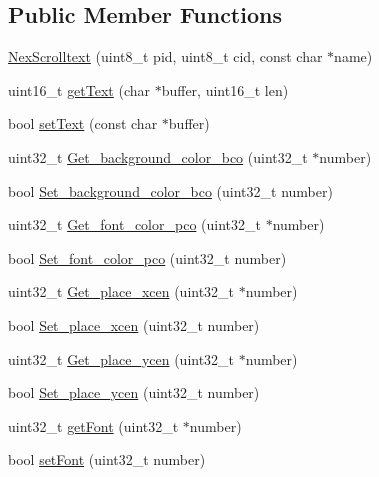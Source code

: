 \subsection*{Public Member Functions}
\begin{DoxyCompactItemize}
\item 
\hyperlink{class_nex_scrolltext_a212aa1505ed7c0bfdb47de3e6e2045fb}{Nex\+Scrolltext} (uint8\+\_\+t pid, uint8\+\_\+t cid, const char $\ast$name)
\item 
uint16\+\_\+t \hyperlink{class_nex_scrolltext_a7cead053146075e7c31d43349d4c897c}{get\+Text} (char $\ast$buffer, uint16\+\_\+t len)
\item 
bool \hyperlink{class_nex_scrolltext_a71b8e2b2bff22e3c0cbdf961a55b8d12}{set\+Text} (const char $\ast$buffer)
\item 
uint32\+\_\+t \hyperlink{class_nex_scrolltext_ac3861fec5efd8cde4535307f231244e7}{Get\+\_\+background\+\_\+color\+\_\+bco} (uint32\+\_\+t $\ast$number)
\item 
bool \hyperlink{class_nex_scrolltext_a50a5211fc6913b97afda045a762cb0c4}{Set\+\_\+background\+\_\+color\+\_\+bco} (uint32\+\_\+t number)
\item 
uint32\+\_\+t \hyperlink{class_nex_scrolltext_a266a3c44131eec0a40b1e12f6cf7d3a1}{Get\+\_\+font\+\_\+color\+\_\+pco} (uint32\+\_\+t $\ast$number)
\item 
bool \hyperlink{class_nex_scrolltext_ac34d68211c4c3c70834c7e7e49ece03f}{Set\+\_\+font\+\_\+color\+\_\+pco} (uint32\+\_\+t number)
\item 
uint32\+\_\+t \hyperlink{class_nex_scrolltext_a066d8439ea088a7ef604abb87802add6}{Get\+\_\+place\+\_\+xcen} (uint32\+\_\+t $\ast$number)
\item 
bool \hyperlink{class_nex_scrolltext_a5126fc70854f0f12f1573ee1eb8959b0}{Set\+\_\+place\+\_\+xcen} (uint32\+\_\+t number)
\item 
uint32\+\_\+t \hyperlink{class_nex_scrolltext_a987a74978f764f74540c8ee0de200564}{Get\+\_\+place\+\_\+ycen} (uint32\+\_\+t $\ast$number)
\item 
bool \hyperlink{class_nex_scrolltext_ae1c1181755c9334a4ea21fa2782aecbf}{Set\+\_\+place\+\_\+ycen} (uint32\+\_\+t number)
\item 
uint32\+\_\+t \hyperlink{class_nex_scrolltext_a2caedb7b97a6028abedaf0b25f9c03e0}{get\+Font} (uint32\+\_\+t $\ast$number)
\item 
bool \hyperlink{class_nex_scrolltext_af2e8602fae103ccadfee037382844ce6}{set\+Font} (uint32\+\_\+t number)
\item 

\end{DoxyCompactItemize}
